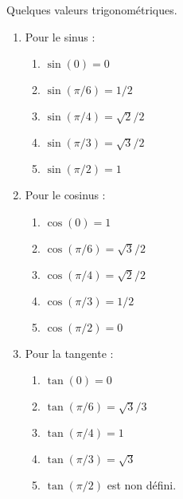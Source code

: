\begin{proposition}
    Quelques valeurs trigonométriques.
    \begin{multicols}{2}
    \begin{enumerate}
        \item
            Pour le sinus :
            \begin{enumerate}
                \item
                    \( \sin(0)=0\)
                \item
                    \( \sin(\pi/6)=1/2\)
                \item
                    \( \sin(\pi/4)=\sqrt{ 2 }/2\)
                \item
                    \( \sin(\pi/3)=\sqrt{ 3 }/2\)
                \item
                    \( \sin(\pi/2)=1\)
            \end{enumerate}
            
        \item
            Pour le cosinus :
            \begin{enumerate}
                \item
                    \( \cos(0)=1\)
                \item
                    \( \cos(\pi/6)=\sqrt{ 3 }/2\)
                \item
                    \( \cos(\pi/4)=\sqrt{ 2 }/2\)
                \item
                    \( \cos(\pi/3)=1/2\)
                \item
                    \( \cos(\pi/2)=0\)
            \end{enumerate}
        \item
            Pour la tangente :
            \begin{enumerate}
                \item
                    \( \tan(0)=0\)
                \item
                    \( \tan(\pi/6)=\sqrt{ 3 }/3\)
                \item
                    \( \tan(\pi/4)=1\)
                \item
                    \( \tan(\pi/3)=\sqrt{ 3 }\)
                \item
                    \( \tan(\pi/2)\) est non défini.
            \end{enumerate}
    \end{enumerate}
\end{multicols}
\end{proposition}

